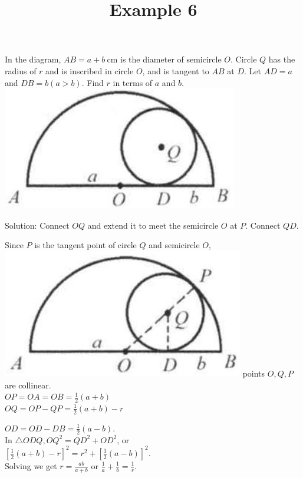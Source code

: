 \documentclass{article}
\title{Example 6}
\date{}
\begin{document}
\maketitle

In the diagram, \(A B=a+b \mathrm{~cm}\) is the diameter of semicircle \(O\). Circle \(Q\) has the radius of \(r\) and is inscribed in circle \(O\), and is tangent to \(A B\) at \(D\). Let \(A D=a\) and \(D B=b(a>b)\). Find \(r\) in terms of \(a\) and \(b\).\\
\centering
\includegraphics[width=\textwidth]{images/problem_image_1.jpg}

Solution:
Connect \(O Q\) and extend it to meet the semicircle \(O\) at \(P\). Connect \(Q D\).

Since \(P\) is the tangent point of circle \(Q\) and semicircle \(O\),\\
\includegraphics[width=\textwidth]{images/reasoning_image_1.jpg} points \(O, Q, P\) are collinear.\\
\(O P=O A=O B=\frac{1}{2}(a+b)\)\\
\(O Q=O P-Q P=\frac{1}{2}(a+b)-r\)


\(O D=O D-D B=\frac{1}{2}(a-b)\).\\
In \(\triangle O D Q, O Q^{2}=Q D^{2}+O D^{2}\), or\\
\(\left[\frac{1}{2}(a+b)-r\right]^{2}=r^{2}+\left[\frac{1}{2}(a-b)\right]^{2}\).\\
Solving we get \(r=\frac{a b}{a+b}\) or \(\frac{1}{a}+\frac{1}{b}=\frac{1}{r}\).
\end{document}
